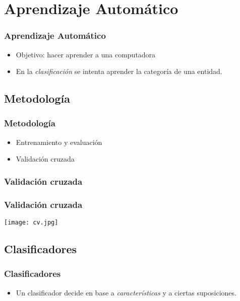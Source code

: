 \section{Aprendizaje Automático}

\begin{frame}
    \frametitle{Aprendizaje Automático}

    \begin{itemize}
        \item Objetivo: hacer aprender a una computadora
        \item En la \emph{clasificación} se intenta aprender la categoría de una entidad.
    \end{itemize}
\end{frame}

\subsection{Metodología}
\begin{frame}
    \frametitle{Metodología}

    \begin{itemize}
        \item Entrenamiento y evaluación
        \item Validación cruzada
    \end{itemize}
\end{frame}

\subsubsection{Validación cruzada}
\begin{frame}
    \frametitle{Validación cruzada}
    
    \begin{center}
        \texttt{[image: cv.jpg]}
    \end{center}
\end{frame}

\subsection{Clasificadores}
\begin{frame}
    \frametitle{Clasificadores}
    
    \begin{itemize}
        \item Un clasificador decide en base a \emph{características} y a ciertas suposiciones.
    \end{itemize}
\end{frame}


